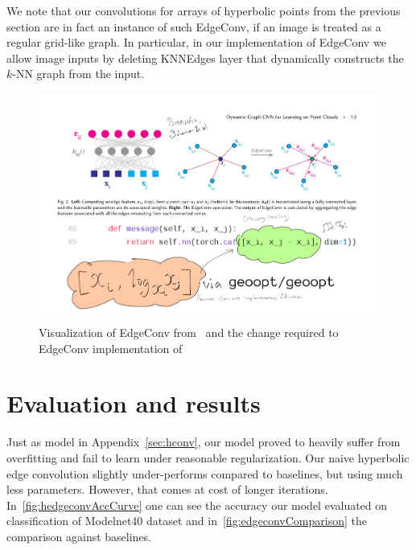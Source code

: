 We note that our convolutions for arrays of hyperbolic points from the previous
section are in fact an instance of such EdgeConv, if an image is treated as a
regular grid-like graph. In particular, in our implementation of EdgeConv we
allow image inputs by deleting \textrm{KNNEdges} layer that dynamically
constructs the \( k \)-NN graph from the input.

\begin{figure}[H]\center
\includegraphics[width=.9\textwidth]{art/hyperbolic-edgeconv.pdf}
\caption{
    Visualization of EdgeConv from~\citet{edgeconv} and the change
        required to EdgeConv implementation of~\citet{pytorchGeometric}
}
\end{figure}

\section{Evaluation and results} \label{sec:results}

Just as model in Appendix~\autoref{sec:hconv}, our model proved to heavily
suffer from overfitting and fail to learn under reasonable regularization.  Our
naive hyperbolic edge convolution slightly under-performs compared to
baselines, but using much less parameters. However, that comes at cost of
longer iterations. In~\autoref{fig:hedgeconvAccCurve} one can see
the accuracy our model evaluated on classification of Modelnet40
dataset and in~\autoref{fig:edgeconvComparison} the comparison
against baselines.

